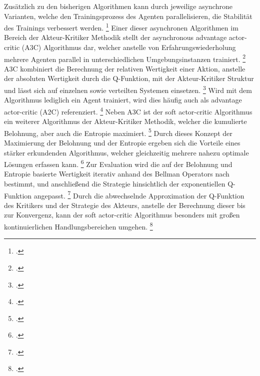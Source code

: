 Zusätzlich zu den bisherigen Algorithmen kann durch jeweilige asynchrone Varianten, welche den Trainingsprozess des Agenten parallelisieren, die Stabilität des Trainings verbessert werden. \footcite[Vgl.][S. 1]{Mnih.2016}
Einer dieser asynchronen Algorithmen im Bereich der Akteur-Kritiker Methodik stellt der asynchronous advantage actor-critic (A3C) Algorithmus dar, welcher anstelle von Erfahrungswiederholung mehrere Agenten parallel in unterschiedlichen Umgebungsinstanzen trainiert. \footcite[Vgl.][S. 1]{Mnih.2016}
A3C kombiniert die Berechnung der relativen Wertigkeit einer Aktion, anstelle der absoluten Wertigkeit durch die Q-Funktion, mit der Akteur-Kritiker Struktur und lässt sich auf einzelnen sowie verteilten Systemen einsetzen. \footcite[Vgl.][S. 9]{Arulkumaran.2017} 
Wird mit dem Algorithmus lediglich ein Agent trainiert, wird dies häufig auch als advantage actor-critic (A2C) referenziert. \footcite[Vgl.][S. 9]{Arulkumaran.2017} 
Neben A3C ist der soft actor-critic Algorithmus ein weiterer Algorithmus der Akteur-Kritiker Methodik, welcher die kumulierte Belohnung, aber auch die Entropie maximiert. \footcite[Vgl.][S. 1]{Haarnoja.2018}
Durch dieses Konzept der Maximierung der Belohnung und der Entropie ergeben sich die Vorteile eines stärker erkundenden Algorithmus, welcher gleichzeitig mehrere nahezu optimale Lösungen erfassen kann. \footcite[Vgl.][S. 3]{Haarnoja.2018}
Zur Evaluation wird die auf der Belohnung und Entropie basierte Wertigkeit iterativ anhand des Bellman Operators nach \cite[]{Bellman.1966} bestimmt, und anschließend die Strategie hinsichtlich der exponentiellen Q-Funktion angepasst. \footcite[Vgl.][S. 4]{Haarnoja.2018}
Durch die abwechselnde Approximation der Q-Funktion des Kritikers und der Strategie des Akteurs, anstelle der Berechnung dieser bis zur Konvergenz, kann der soft actor-critic Algorithmus besonders mit großen kontinuierlichen Handlungsbereichen umgehen. \footcite[Vgl.][S. 4]{Haarnoja.2018}

